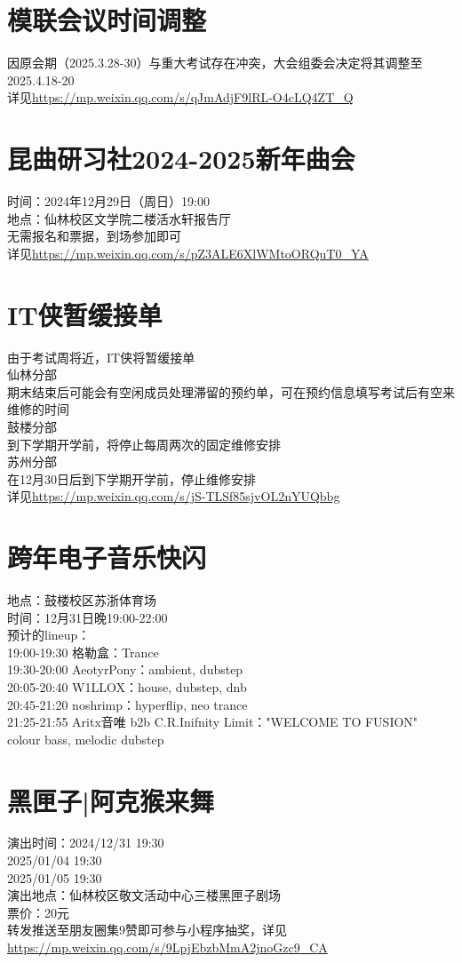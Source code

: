 \documentclass[letterpaper, 12pt]{article}
\begin{document}
\begin{multicols}{2}
\section{模联会议时间调整}
因原会期（2025.3.28-30）与重大考试存在冲突，大会组委会决定将其调整至2025.4.18-20\\
详见\url{https://mp.weixin.qq.com/s/qJmAdjF9lRL-O4cLQ4ZT_Q}

\section{昆曲研习社2024-2025新年曲会}
时间：2024年12月29日（周日）19:00\\
地点：仙林校区文学院二楼活水轩报告厅\\
无需报名和票据，到场参加即可\\
详见\url{https://mp.weixin.qq.com/s/pZ3ALE6XlWMtoORQuT0_YA}



\section{IT侠暂缓接单}
由于考试周将近，IT侠将暂缓接单\\
仙林分部\\
期末结束后可能会有空闲成员处理滞留的预约单，可在预约信息填写考试后有空来维修的时间\\
鼓楼分部\\
到下学期开学前，将停止每周两次的固定维修安排\\
苏州分部\\
在12月30日后到下学期开学前，停止维修安排\\
详见\url{https://mp.weixin.qq.com/s/jS-TLSf85sjvOL2nYUQbbg}

\section{跨年电子音乐快闪}
地点：鼓楼校区苏浙体育场\\
时间：12月31日晚19:00-22:00\\
预计的lineup：\\
19:00-19:30 格勒盒：Trance\\
19:30-20:00 AeotyrPony：ambient, dubstep\\
20:05-20:40 W1LLOX：house, dubstep, dnb\\
20:45-21:20 noshrimp：hyperflip, neo trance\\
21:25-21:55 Aritx音唯 b2b C.R.Inifnity Limit："WELCOME TO FUSION" colour bass, melodic dubstep\\

\section{黑匣子|阿克猴来舞}
演出时间：2024/12/31  19:30\\
2025/01/04  19:30\\
2025/01/05  19:30\\
演出地点：仙林校区敬文活动中心三楼黑匣子剧场\\
票价：20元\\
转发推送至朋友圈集9赞即可参与小程序抽奖，详见\url{https://mp.weixin.qq.com/s/9LpjEbzbMmA2jnoGzc9_CA}

\end{multicols} 
\end{document}
